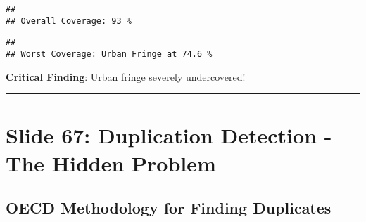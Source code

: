 \documentclass[
]{article}
\newenvironment{Shaded}{\begin{snugshade}}{\end{snugshade}}
\newcommand{\FunctionTok}[1]{\textcolor[rgb]{0.13,0.29,0.53}{\textbf{#1}}}
\newcommand{\NormalTok}[1]{#1}
\newcommand{\SpecialCharTok}[1]{\textcolor[rgb]{0.81,0.36,0.00}{\textbf{#1}}}
\newcommand{\StringTok}[1]{\textcolor[rgb]{0.31,0.60,0.02}{#1}}
\begin{document}
\begin{verbatim}
## 
## Overall Coverage: 93 %
\end{verbatim}

\begin{Shaded}
\end{Shaded}

\begin{verbatim}
## 
## Worst Coverage: Urban Fringe at 74.6 %
\end{verbatim}

\textbf{Critical Finding}: Urban fringe severely undercovered!

\begin{center}\rule{0.5\linewidth}{0.5pt}\end{center}

\section{Slide 67: Duplication Detection - The Hidden
Problem}\label{slide-67-duplication-detection---the-hidden-problem}

\subsection{OECD Methodology for Finding
Duplicates}\label{oecd-methodology-for-finding-duplicates}
\end{document}
